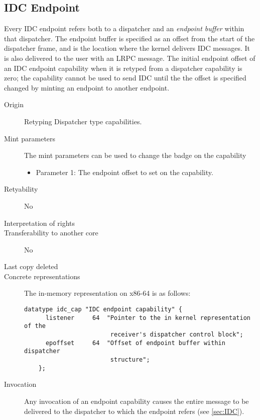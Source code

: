 \subsection{IDC Endpoint}
    
Every IDC endpoint refers both to a dispatcher and an \emph{endpoint
  buffer} within that dispatcher. The endpoint buffer is specified as
an offset from the start of the dispatcher frame, and is the location
where the kernel delivers IDC messages. It is also delivered to the
user with an LRPC message.  The initial endpoint offset of an IDC
endpoint capability when it is retyped from a dispatcher capability is
zero; the capability cannot be used to send IDC until the the offset
is specified changed by minting an endpoint to another endpoint.

\begin{description}
\item[Origin] Retyping Dispatcher type capabilities.

\item[Mint parameters] The mint parameters can be used to change the
  badge on the capability
  \begin{itemize}
  \item Parameter 1: The endpoint offset to set on the capability.
  \end{itemize}
  
\item[Retyability] No
  
\item[Interpretation of rights] 
  
\item[Transferability to another core] No

\item[Last copy deleted] 
  
\item[Concrete representations] The in-memory representation on x86-64
  is as follows:
  
  \begin{lstlisting}[language=Mackerel]
    datatype idc_cap "IDC endpoint capability" {
      listener     64  "Pointer to the in kernel representation of the
                        receiver's dispatcher control block";
      epoffset     64  "Offset of endpoint buffer within dispatcher
                        structure";
    };
  \end{lstlisting}
  
\item[Invocation] Any invocation of an endpoint capability causes the
  entire message to be delivered to the dispatcher to which the
  endpoint refers (see \ref{sec:IDC}).
  \end{description}

